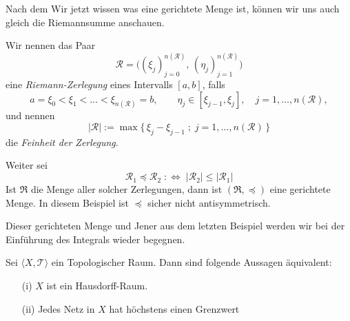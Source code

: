 Nach dem Wir jetzt wissen was eine gerichtete Menge ist, 
können wir uns auch gleich die Riemannsumme anschauen.

{
    Wir nennen das Paar 
$$
\mathcal{R} = \bigl((\xi_j)_{j=0}^{n(\mathcal{R})}, \, (\eta_j)_{j=1}^{n(\mathcal{R})}\bigr)
$$
eine \emph{Riemann-Zerlegung} eines Intervalls $[a,b]$, falls
$$
a = \xi_0 < \xi_1 < \dots < \xi_{n(\mathcal{R})} = b, 
\qquad \eta_j \in [\xi_{j-1}, \xi_j], \quad j=1,\dots,n(\mathcal{R}),
$$
und nennen
$$
|\mathcal{R}| := \max \{\, \xi_j - \xi_{j-1} \; ; \; j=1,\dots,n(\mathcal{R}) \,\}
$$
die \emph{Feinheit der Zerlegung}.

Weiter sei 
$$
\mathcal{R}_1 \preceq \mathcal{R}_2 \;:\Longleftrightarrow\; |\mathcal{R}_2| \leq |\mathcal{R}_1|
$$
Ist $\Re$ die Menge aller solcher Zerlegungen, dann ist $(\Re,\preceq)$ eine gerichtete Menge.
In diesem Beispiel ist $\preceq$ sicher nicht antisymmetrisch.

\medskip

Dieser gerichteten Menge und Jener aus dem letzten Beispiel werden wir bei der Einführung 
des Integrals wieder begegnen.
}

\mprop{}
{
    Sei $\langle X, \mathcal{T} \rangle$ ein Topologischer Raum.
    Dann sind folgende Aussagen äquivalent:
\begin{itemize}
    \item[(i)] $X$ ist ein Hausdorff-Raum.
    \item[(ii)] Jedes Netz in $X$ hat höchstens einen Grenzwert
\end{itemize}
}

